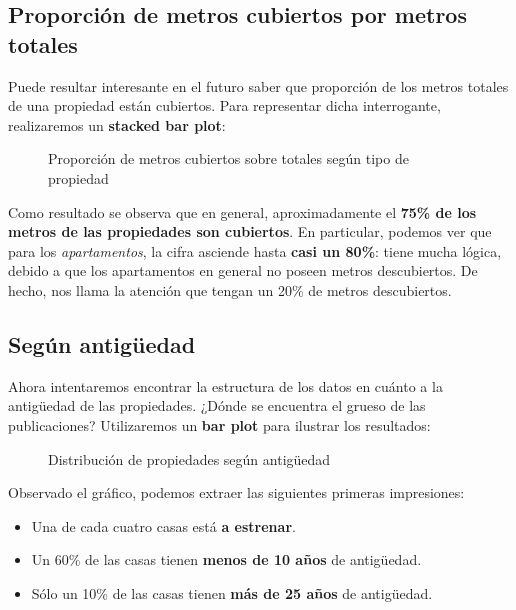 \documentclass[
10pt, %
a4paper, %
oneside, %
headinclude,footinclude, %
BCOR5mm, %
]{scrartcl}
\begin{document}
    \subsection{Proporci\'on de metros cubiertos por metros totales}
    Puede resultar interesante en el futuro saber que proporci\'on de los metros totales de una propiedad est\'an cubiertos. Para representar dicha interrogante, realizaremos un \textbf{stacked bar plot}:
    
    \begin{figure}[H]
        \caption{Proporción de metros cubiertos sobre totales seg\'un tipo de propiedad}
        \label{fig:distribucion-metros}
    \end{figure}
    
   Como resultado se observa que en general, aproximadamente el \textbf{75\% de los metros de las propiedades son cubiertos}. En particular, podemos ver que para los \textit{apartamentos}, la cifra asciende hasta \textbf{casi un 80\%}: tiene mucha l\'ogica, debido a que los apartamentos en general no poseen metros descubiertos. De hecho, nos llama la atenci\'on que tengan un 20\% de metros descubiertos.
    
    \subsection{Seg\'un antigüedad}
    Ahora intentaremos encontrar la estructura de los datos en cu\'anto a la antigüedad de las propiedades. ¿D\'onde se encuentra el grueso de las publicaciones? Utilizaremos un \textbf{bar plot} para ilustrar los resultados:
    
    \begin{figure}[H]
        \caption{Distribuci\'on de propiedades seg\'un antigüedad}
        \label{fig:distribucion-antiguedad}
    \end{figure}
    
    Observado el gr\'afico, podemos extraer las siguientes primeras impresiones:
    
    \begin{itemize}
        \item Una de cada cuatro casas est\'a \textbf{a estrenar}.
        \item Un 60\% de las casas tienen \textbf{menos de 10 años} de antigüedad.
        \item S\'olo un 10\% de las casas tienen \textbf{m\'as de 25 años} de antigüedad.
    \end{itemize}
    
\end{document}
